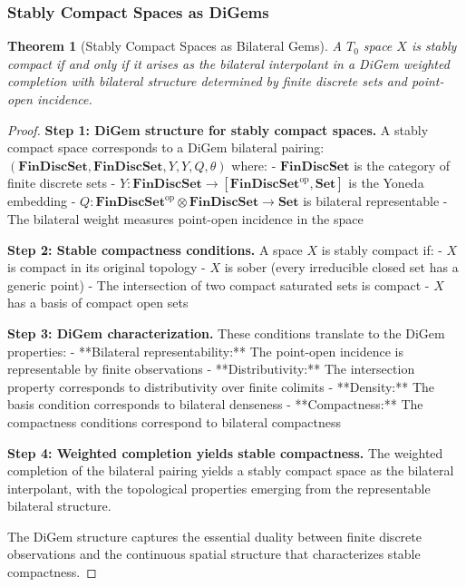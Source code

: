 \documentclass[11pt]{article}
\theoremstyle{plain}
\newtheorem{theorem}{Theorem}[section]
\theoremstyle{definition}
\theoremstyle{remark}
\newcommand{\op}{\mathrm{op}}
\begin{document}
\subsubsection{Stably Compact Spaces as DiGems}

\begin{theorem}[Stably Compact Spaces as Bilateral Gems]\label{thm:stably-compact-digems}
A $T_0$ space $X$ is stably compact if and only if it arises as the bilateral interpolant in a DiGem weighted completion with bilateral structure determined by finite discrete sets and point-open incidence.
\end{theorem}

\begin{proof}
\textbf{Step 1: DiGem structure for stably compact spaces.}
A stably compact space corresponds to a DiGem bilateral pairing:
$(\mathbf{FinDiscSet}, \mathbf{FinDiscSet}, Y, Y, Q, \theta)$ where:
- $\mathbf{FinDiscSet}$ is the category of finite discrete sets
- $Y : \mathbf{FinDiscSet} \to [\mathbf{FinDiscSet}^{\op}, \mathbf{Set}]$ is the Yoneda embedding  
- $Q : \mathbf{FinDiscSet}^{\op} \otimes \mathbf{FinDiscSet} \to \mathbf{Set}$ is bilateral representable
- The bilateral weight measures point-open incidence in the space

\textbf{Step 2: Stable compactness conditions.}
A space $X$ is stably compact if:
- $X$ is compact in its original topology
- $X$ is sober (every irreducible closed set has a generic point)  
- The intersection of two compact saturated sets is compact
- $X$ has a basis of compact open sets

\textbf{Step 3: DiGem characterization.}
These conditions translate to the DiGem properties:
- **Bilateral representability:** The point-open incidence is representable by finite observations
- **Distributivity:** The intersection property corresponds to distributivity over finite colimits
- **Density:** The basis condition corresponds to bilateral denseness
- **Compactness:** The compactness conditions correspond to bilateral compactness

\textbf{Step 4: Weighted completion yields stable compactness.}
The weighted completion of the bilateral pairing yields a stably compact space as the bilateral interpolant, with the topological properties emerging from the representable bilateral structure.

The DiGem structure captures the essential duality between finite discrete observations and the continuous spatial structure that characterizes stable compactness.
\end{proof}
\end{document}

